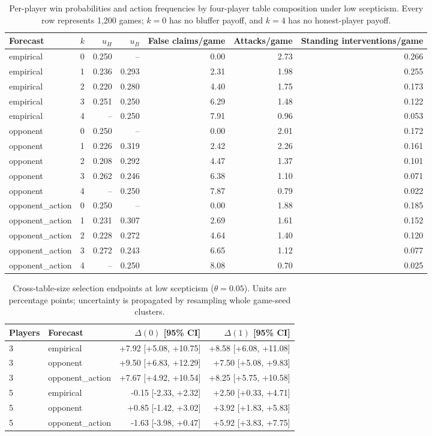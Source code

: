 \begin{table}[htbp]\centering\scriptsize
\caption{Per-player win probabilities and action frequencies by four-player table composition under low scepticism. Every row represents 1,200 games; $k=0$ has no bluffer payoff, and $k=4$ has no honest-player payoff.}
\label{tab:s2}
\begin{tabular}{llrrrrr}\toprule
Forecast & $k$ & $u_H$ & $u_B$ & False claims/game & Attacks/game & Standing interventions/game \\ \midrule
empirical & 0 & 0.250 & -- & 0.00 & 2.73 & 0.266 \\
empirical & 1 & 0.236 & 0.293 & 2.31 & 1.98 & 0.255 \\
empirical & 2 & 0.220 & 0.280 & 4.40 & 1.75 & 0.173 \\
empirical & 3 & 0.251 & 0.250 & 6.29 & 1.48 & 0.122 \\
empirical & 4 & -- & 0.250 & 7.91 & 0.96 & 0.053 \\
opponent & 0 & 0.250 & -- & 0.00 & 2.01 & 0.172 \\
opponent & 1 & 0.226 & 0.319 & 2.42 & 2.26 & 0.161 \\
opponent & 2 & 0.208 & 0.292 & 4.47 & 1.37 & 0.101 \\
opponent & 3 & 0.262 & 0.246 & 6.38 & 1.10 & 0.071 \\
opponent & 4 & -- & 0.250 & 7.87 & 0.79 & 0.022 \\
opponent\_action & 0 & 0.250 & -- & 0.00 & 1.88 & 0.185 \\
opponent\_action & 1 & 0.231 & 0.307 & 2.69 & 1.61 & 0.152 \\
opponent\_action & 2 & 0.228 & 0.272 & 4.64 & 1.40 & 0.120 \\
opponent\_action & 3 & 0.272 & 0.243 & 6.65 & 1.12 & 0.077 \\
opponent\_action & 4 & -- & 0.250 & 8.08 & 0.70 & 0.025 \\
\bottomrule\end{tabular}\end{table}
\begin{table}[htbp]\centering\scriptsize
\caption{Cross-table-size selection endpoints at low scepticism ($\theta=0.05$). Units are percentage points; uncertainty is propagated by resampling whole game-seed clusters.}
\label{tab:s3}
\begin{tabular}{llrr}\toprule
Players & Forecast & $\Delta(0)$ [95\% CI] & $\Delta(1)$ [95\% CI] \\ \midrule
3 & empirical & +7.92 [+5.08, +10.75] & +8.58 [+6.08, +11.08] \\
3 & opponent & +9.50 [+6.83, +12.29] & +7.50 [+5.08, +9.83] \\
3 & opponent\_action & +7.67 [+4.92, +10.54] & +8.25 [+5.75, +10.58] \\
5 & empirical & -0.15 [-2.33, +2.32] & +2.50 [+0.33, +4.71] \\
5 & opponent & +0.85 [-1.42, +3.02] & +3.92 [+1.83, +5.83] \\
5 & opponent\_action & -1.63 [-3.98, +0.47] & +5.92 [+3.83, +7.75] \\
\bottomrule\end{tabular}\end{table}
